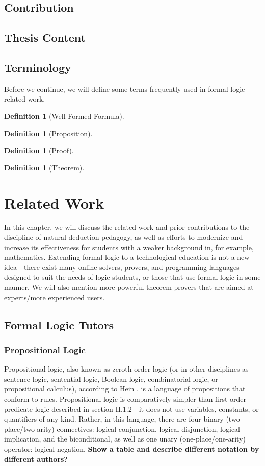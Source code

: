 \documentclass[ms]{uncgdissertationexp2}
\theoremstyle{plain}
\theoremstyle{definition}
\newtheorem{definition}[theorem]{Definition}
\theoremstyle{remark}
\begin{document}
    \section{Contribution}
    \section{Thesis Content}
    \section{Terminology}
    Before we continue, we will define some terms frequently used in formal logic-related work.
    \begin{definition}[Well-Formed Formula]
    \end{definition}
    
    \begin{definition}[Proposition]
    \end{definition}

    \begin{definition}[Proof]
    \end{definition}
    
    \begin{definition}[Theorem]
    \end{definition}
\chapter{Related Work}
    In this chapter, we will discuss the related work and prior contributions to the discipline of natural deduction pedagogy, as well as efforts to modernize and increase its effectiveness for students with a weaker background in, for example, mathematics. 
    Extending formal logic to a technological education is not a new idea---there exist many online solvers, provers, and programming languages designed to suit the needs of logic students, or those that use formal logic in some manner. We will also mention more powerful theorem provers that are aimed at experts/more experienced users.
    \section{Formal Logic Tutors}
        \subsection{Propositional Logic}
        Propositional logic, also known as zeroth-order logic (or in other disciplines as sentence logic, sentential logic, Boolean logic, combinatorial logic, or propositional calculus), according to Hein \cite{hein}, is a language of propositions that conform to rules. Propositional logic is comparatively simpler than first-order predicate logic described in section II.1.2---it does not use variables, constants, or quantifiers of any kind. Rather, in this language, there are four binary (two-place/two-arity) connectives: logical conjunction, logical disjunction, logical implication, and the biconditional, as well as one unary (one-place/one-arity) operator: logical negation. \textbf{Show a table and describe different notation by different authors?}
        
\end{document}
